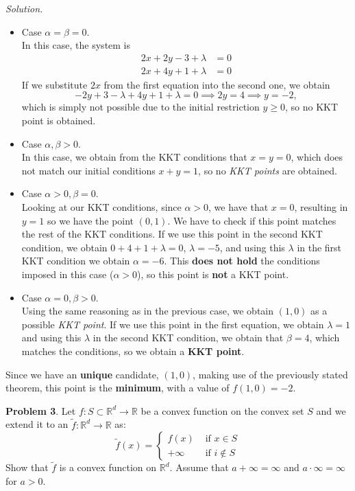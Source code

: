 \documentclass[a4paper]{article}
\newenvironment{problem}[2][Problem]
    { \begin{mdframed}[backgroundcolor=gray!20] \vspace*{0.1cm} \textbf{#1 #2}.}
    {  \end{mdframed}\vspace{0.3cm}}
\newenvironment{solution}
    {\textit{Solution.}\\}
    {}
\newcommand{\R}{\mathbb R}
\begin{document}
\begin{solution}
  \begin{itemize}
    \item Case \(\alpha = \beta = 0\).\\
          In this case, the system is
          \begin{align*}
            2x + 2y - 3 + \lambda & = 0 \\
            2x + 4y +1 + \lambda  & = 0
          \end{align*}
          If we substitute \(2x\) from the first equation into the second one, we obtain
          \[
            -2y +3 - \lambda +4y + 1 + \lambda = 0 \implies 2y = 4  \implies y = -2,
          \]
          which is simply not possible due to the initial restriction \(y \geq 0\), so no KKT point is obtained.
    \item Case \(\alpha, \beta > 0\).\\
          In this case, we obtain from the KKT conditions that \(x=  y = 0\), which does not match our initial conditions \(x+y = 1\), so no \emph{KKT points} are obtained.
    \item Case \(\alpha > 0, \beta = 0\).\\
          Looking at our KKT conditions, since \(\alpha > 0\), we have that \(x = 0\), resulting in \(y=1\) so we have the point \((0,1)\). We have to check if this point matches the rest of the KKT conditions. If we use this point in the second KKT condition, we obtain \(0+4+1 + \lambda = 0\), \(\lambda = -5\), and using this \(\lambda\) in the first KKT condition we obtain \(\alpha = -6\). This \textbf{does not hold} the conditions imposed in this case (\(\alpha > 0\)), so this point is \textbf{not} a KKT point.
    \item Case \(\alpha = 0, \beta > 0\).\\
          Using the same reasoning as in the previous case, we obtain \((1,0)\) as a possible \emph{KKT point}. If we use this point in the first equation, we obtain \(\lambda = 1\) and using this \(\lambda\) in the second KKT condition, we obtain that \(\beta = 4\), which matches the conditions, so we obtain a \textbf{KKT point}.
  \end{itemize}

  Since we have an \textbf{unique} candidate, \((1,0)\), making use of the previously stated theorem, this point is the \textbf{minimum}, with a value of \(f(1,0) = -2\).

\end{solution}

\begin{problem}{3}
Let \(f: S \subset \R^d \to \R\) be a convex function on the convex set \(S\) and we extend it to an \(\tilde f : \R^d \to \R\) as:
\[
  \tilde f(x) = \begin{cases}
    f(x)    & \text{ if } x \in S    \\
    +\infty & \text{ if } i \notin S
  \end{cases}
\]
Show that \(\tilde f\) is a convex function on \(\R^d\). Assume that \(a+\infty = \infty\) and \(a\cdot \infty = \infty\) for \(a > 0\).
\end{problem}
\end{document}
